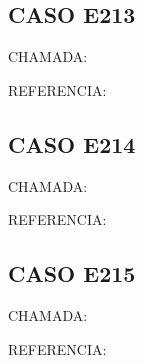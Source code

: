 \documentclass{undftex}
\begin{document}
\begin{refsection}\section*{CASO E213}\noindent CHAMADA: \par\noindent REFERENCIA:\par\printbibliography[heading=none]\end{refsection}\clearpage
\begin{refsection}\section*{CASO E214}\noindent CHAMADA: \par\noindent REFERENCIA:\par\printbibliography[heading=none]\end{refsection}\clearpage
\begin{refsection}\section*{CASO E215}\noindent CHAMADA: \par\noindent REFERENCIA:\par\printbibliography[heading=none]\end{refsection}\clearpage
\end{document}
